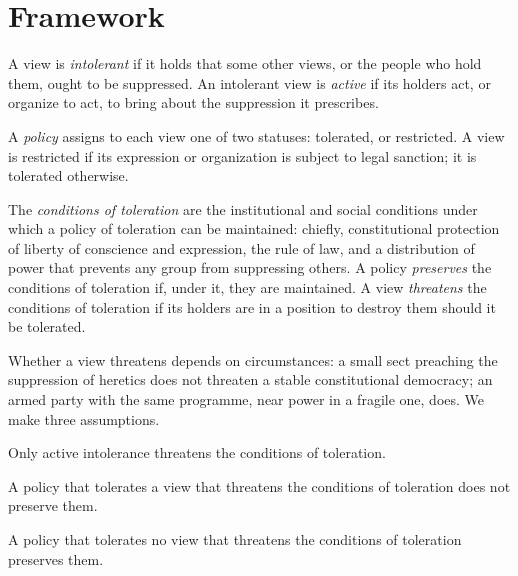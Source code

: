 \documentclass{situationist-preprint}
\begin{document}
\section{Framework}

\begin{definition}\label{d:views}
A view is \emph{intolerant} if it holds that some other views, or the people who hold them, ought to be suppressed. An intolerant view is \emph{active} if its holders act, or organize to act, to bring about the suppression it prescribes.
\end{definition}

\begin{definition}[Policy]\label{d:policy}
A \emph{policy} assigns to each view one of two statuses: tolerated, or restricted. A view is restricted if its expression or organization is subject to legal sanction; it is tolerated otherwise.
\end{definition}

\begin{definition}\label{d:conditions}
The \emph{conditions of toleration} are the institutional and social conditions under which a policy of toleration can be maintained: chiefly, constitutional protection of liberty of conscience and expression, the rule of law, and a distribution of power that prevents any group from suppressing others. A policy \emph{preserves} the conditions of toleration if, under it, they are maintained. A view \emph{threatens} the conditions of toleration if its holders are in a position to destroy them should it be tolerated.
\end{definition}

Whether a view threatens depends on circumstances: a small sect preaching the suppression of heretics does not threaten a stable constitutional democracy; an armed party with the same programme, near power in a fragile one, does. We make three assumptions.

\begin{assumption}\label{a:only}
Only active intolerance threatens the conditions of toleration.
\end{assumption}

\begin{assumption}\label{a:fails}
A policy that tolerates a view that threatens the conditions of toleration does not preserve them.
\end{assumption}

\begin{assumption}\label{a:suffices}
A policy that tolerates no view that threatens the conditions of toleration preserves them.
\end{assumption}
\end{document}
